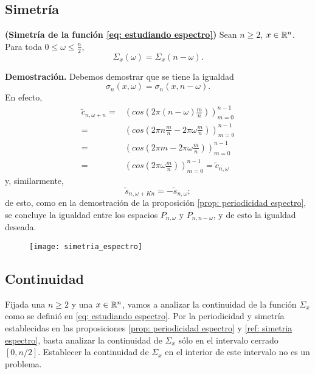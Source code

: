 \subsection{Simetría}
\begin{prop}
\label{ref: simetria espectro}
\textbf{(Simetría de la función
\eqref{eq: estudiando espectro})}
Sean
$n \geq 2$,
$x \in \mathbb{R}^{n}$. Para toda $0 \leq \omega \leq \frac{n}{2}$,
\[
\Sigma_{x}(\omega) = \Sigma_{x}(n-\omega).
\]
\end{prop}
\noindent
\textbf{Demostración.}
Debemos demostrar que se tiene la igualdad 
\[
\sigma_{n}(x, \omega) = 
\sigma_{n}(x, n-\omega ).
\]
En efecto, 
\begin{align*}
\tilde{c}_{n, \omega + n} = & \left( cos \left( 2 \pi
\left( n- \omega \right) \frac{m}{n} \right) \right)_{m=0}^{n-1} \\
= & \left( cos \left( 
2 \pi n \frac{m}{n} - 2 \pi \omega
\frac{m}{n}
\right) \right)_{m=0}^{n-1} \\
= & \left( cos \left( 
2 \pi m - 2 \pi \omega \frac{m}{n} 
\right) \right)_{m=0}^{n-1} \\
= & \left( cos \left( 2 \pi \omega \frac{m}{n} \right) \right)_{m=0}^{n-1}
= \tilde{c}_{n, \omega}
\end{align*}
y, similarmente,
\[
\tilde{s}_{n, \omega + Kn} = -\tilde{s}_{n, \omega};
\]
de esto, como en la demostración de la proposición
\ref{prop: periodicidad espectro}, se concluye la igualdad
entre los espacios $P_{n, \omega}$ y $P_{n, n-\omega}$, y de esto
la igualdad deseada.
\QEDB
\vspace{0.2cm}

\begin{figure}[H]
	\centering
	\texttt{[image: simetria\_espectro]} 
\end{figure}	


\subsection{Continuidad}

Fijada una $n \geq 2$ y una $x \in \mathbb{R}^{n}$,
vamos a analizar la continuidad de la función
$\Sigma_{x}$ como se definió 
en \eqref{eq: estudiando espectro}.
Por la periodicidad y simetría establecidas
en las proposiciones 
\ref{prop: periodicidad espectro}
y \ref{ref: simetria espectro}, basta
analizar la continuidad de $\Sigma_{x}$ sólo en el
intervalo cerrado $[0, n/2]$. Establecer la continuidad
de $\Sigma_{x}$ en el interior de este intervalo no es un problema. \\


